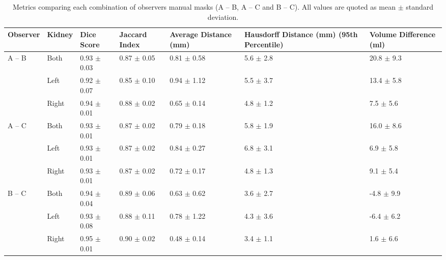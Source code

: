 \begin{table}[H]
	\centering
	\begin{adjustbox}{width=1.0\textwidth, center}
	\begin{tabularx}{1.25\textwidth}{XX||X|X|X|X|X}
		Observer               & Kidney & Dice   Score  & Jaccard   Index & Average   Distance (mm) & Hausdorff   Distance (mm) (95th Percentile) & Volume   Difference (ml) \\ \hline
		\multirow{3}{*}{A – B} & Both   & 0.93   $\pm$ 0.03 & 0.87   $\pm$ 0.05   & 0.81   $\pm$ 0.58           & 5.6   $\pm$ 2.8                               & 20.8   $\pm$ 9.3           \\ \cline{2-7} 
		& Left   & 0.92 $\pm$ 0.07   & 0.85 $\pm$ 0.10     & 0.94 $\pm$ 1.12             & 5.5 $\pm$ 3.7                                 & 13.4 $\pm$ 5.8             \\ \cline{2-7} 
		& Right  & 0.94   $\pm$ 0.01 & 0.88   $\pm$ 0.02   & 0.65   $\pm$ 0.14           & 4.8   $\pm$ 1.2                               & 7.5   $\pm$ 5.6            \\ \hline
		\multirow{3}{*}{A – C} & Both   & 0.93 $\pm$ 0.01   & 0.87 $\pm$ 0.02     & 0.79 $\pm$ 0.18             & 5.8 $\pm$ 1.9                                 & 16.0 $\pm$ 8.6             \\ \cline{2-7} 
		& Left   & 0.93   $\pm$ 0.01 & 0.87   $\pm$ 0.02   & 0.84   $\pm$ 0.27           & 6.8   $\pm$ 3.1                               & 6.9   $\pm$ 5.8            \\ \cline{2-7} 
		& Right  & 0.93 $\pm$ 0.01   & 0.87 $\pm$ 0.02     & 0.72 $\pm$ 0.17             & 4.8 $\pm$ 1.3                                 & 9.1 $\pm$ 5.4              \\ \hline
		\multirow{3}{*}{B – C} & Both   & 0.94   $\pm$ 0.04 & 0.89   $\pm$ 0.06   & 0.63   $\pm$ 0.62           & 3.6   $\pm$ 2.7                               & -4.8   $\pm$ 9.9           \\ \cline{2-7} 
		& Left   & 0.93 $\pm$ 0.08   & 0.88 $\pm$ 0.11     & 0.78 $\pm$ 1.22             & 4.3 $\pm$ 3.6                                 & -6.4 $\pm$ 6.2             \\ \cline{2-7} 
		& Right  & 0.95   $\pm$ 0.01 & 0.90   $\pm$ 0.02   & 0.48   $\pm$ 0.14           & 3.4   $\pm$ 1.1                               & 1.6   $\pm$ 6.6           
	\end{tabularx}
	\end{adjustbox}
	\caption{Metrics comparing each combination of observers manual masks (A – B, A – C and B – C). All values are quoted as mean $\pm$ standard deviation.}
\label{tab:ml_manual_metrics}
\end{table}

